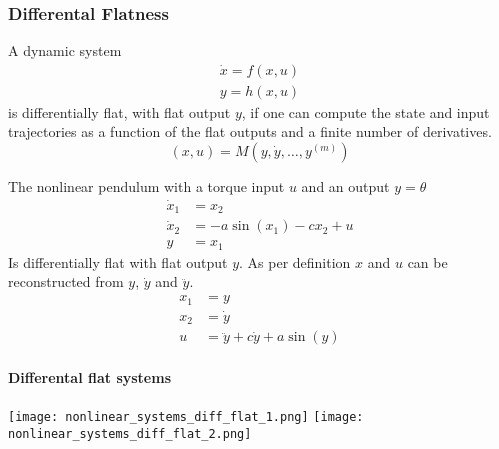 \subsubsection{Differental Flatness}\label{diff_flatness}
A dynamic system
\begin{gather*}
    \dot{x} = f(x,u) \\
    y = h(x,u)
\end{gather*}
is differentially flat, with flat output $y$, if one can compute the state and input trajectories as a function of the flat outputs and a finite number of derivatives.
\begin{equation*}
    (x,u) = M(y,\dot{y}, \ldots, y^{(m)})
\end{equation*}

\begin{examplesection}[Pendulum]
    The nonlinear pendulum with a torque input $u$ and an output $y=\theta$
    \begin{align*}
        \dot{x}_1 & = x_2                    \\
        \dot{x}_2 & = -a \sin(x_1)-c x_2 + u \\
        y         & = x_1
    \end{align*}
    Is differentially flat with flat output $y$. As per definition $x$ and $u$ can be reconstructed from $y$, $\dot{y}$ and $\ddot{y}$.
    \begin{align*}
        x_1 & = y                                \\
        x_2 & = \dot{y}                          \\
        u   & = \ddot{y} + c \dot{y} + a \sin(y)
    \end{align*}
\end{examplesection}

\paragraph{Differental flat systems}
\begin{center}
    \texttt{[image: nonlinear\_systems\_diff\_flat\_1.png]}
    \texttt{[image: nonlinear\_systems\_diff\_flat\_2.png]}
\end{center}

